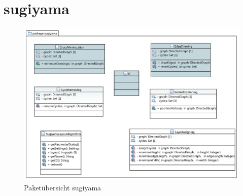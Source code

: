 \newpage

\section{sugiyama}

\begin{figure}[hb]
  \centering
  \includegraphics[width=380pt]{resourcen/sugiyama.pdf}
  \caption{Paketübersicht sugiyama}
  \label{fig:packge_sugiyama}
\end{figure}

